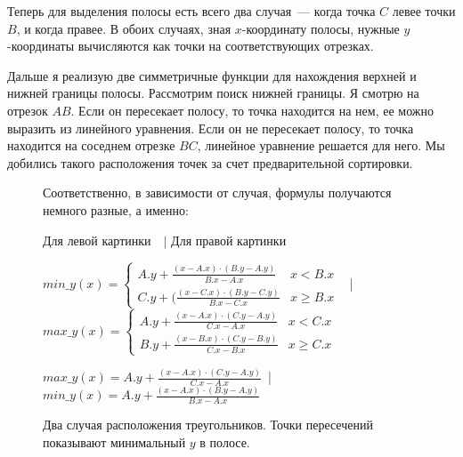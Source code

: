 \documentclass{article}
\begin{document}
Теперь для выделения полосы есть всего два случая~--- когда точка $C$ левее точки $B$, и когда правее. В обоих случаях, зная $x$-координату полосы, нужные $y$-координаты вычисляются как точки на соответствующих отрезках. 

Дальше я реализую две симметричные функции для нахождения верхней и нижней границы полосы. Рассмотрим поиск нижней границы. Я смотрю на отрезок $AB$. Если он пересекает полосу, то точка находится на нем, ее можно выразить из линейного уравнения. Если он не пересекает полосу, то точка находится на соседнем отрезке $BC$, линейное уравнение решается для него. Мы добились такого расположения точек за счет предварительной сортировки.


\begin{center}
\begin{figure}[H]
\caption{Два случая расположения треугольников. Точки пересечений показывают минимальный $y$ в полосе.}
\label{ris:image}
Соответственно, в зависимости от случая, формулы получаются немного разные, а именно:

Для левой картинки~~$\bigg|$ Для правой картинки

$min\_y(x) = \begin{cases} A.y + \frac{(x - A.x) \cdot (B.y - A.y)}{B.x - A.x} & x < B.x \\ C.y + (\frac{(x - C.x)\cdot (B.y - C.y)}{B.x - C.x} & x \ge B.x\end{cases}$ 
~\bigg|~
$max\_y(x) = \begin{cases} A.y + \frac{(x - A.x) \cdot(C.y - A.y)}{C.x - A.x} & x < C.x \\ B.y + \frac{(x - B.x) \cdot(C.y - B.y)}{C.x - B.x} & x \ge C.x\end{cases}$ 

$max\_y(x) = A.y + \frac{(x - A.x) \cdot(C.y - A.y)}{C.x - A.x}$~\bigg|~$min\_y(x) = A.y + \frac{(x - A.x) \cdot (B.y - A.y)}{B.x - A.x}$
\end{figure}
\end{center}
\end{document}
